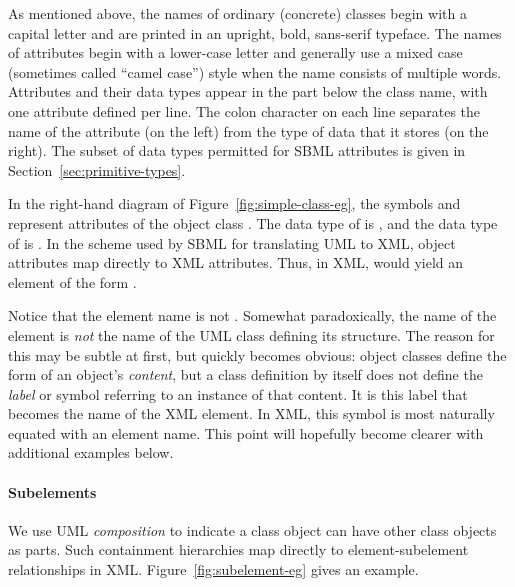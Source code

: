 As mentioned above, the names of ordinary (concrete) classes begin
with a capital letter and are printed in an upright,
bold, sans-serif typeface.  The names of attributes
begin with a lower-case letter and generally use a mixed case
(sometimes called ``camel case'') style when the name consists of
multiple words.  Attributes and their data types appear in the
part below the class name, with one attribute defined per line.
The colon character on each line separates the name of the
attribute (on the left) from the type of data that it stores (on
the right).  The subset of data types permitted for SBML
attributes is given in Section~\ref{sec:primitive-types}.

In the right-hand diagram of Figure~\ref{fig:simple-class-eg}, the
symbols  and  represent
attributes of the object class .  The data
type of  is , and the data type of
 is .  In the scheme used
by SBML for translating UML to XML, object attributes map directly
to XML attributes.  Thus, in XML,  would yield
an element of the form .

Notice that the element name is not .
Somewhat paradoxically, the name of the element is \emph{not} the
name of the UML class defining its structure.  The reason for this
may be subtle at first, but quickly becomes obvious: object
classes define the form of an object's \emph{content}, but a class
definition by itself does not define the \emph{label} or symbol
referring to an instance of that content.  It is this label that
becomes the name of the XML element.  In XML, this symbol is most
naturally equated with an element name.  This point will hopefully
become clearer with additional examples below.


\paragraph{Subelements}

We use UML \emph{composition} to indicate a class object can
have other class objects as parts.  Such containment hierarchies
map directly to element-subelement relationships in XML.
Figure~\ref{fig:subelement-eg} gives an example.

